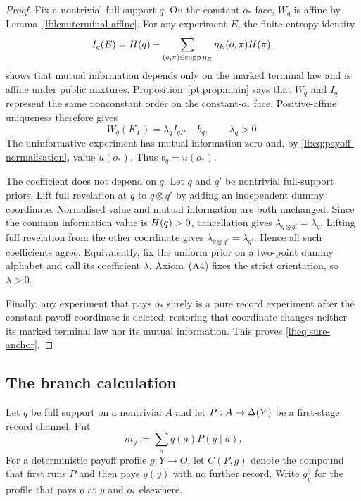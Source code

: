 \begin{proof}
Fix a nontrivial full-support $q$.  On the constant-$o_\ast$ face, $W_q$ is
affine by Lemma~\ref{lf:lem:terminal-affine}.  For any experiment $E$, the
finite entropy identity
\begin{equation}
I_q(E)=H(q)-\sum_{(o,\pi)\in\operatorname{supp}\eta_E}
\eta_E(o,\pi)H(\pi).
\label{lf:eq:posterior-entropy}
\end{equation}
shows that mutual information depends only on the marked terminal law and is
affine under public mixtures.  Proposition~\ref{pt:prop:main} says that $W_q$ and
$I_q$ represent the same nonconstant order on the constant-$o_\ast$ face.
Positive-affine uniqueness therefore gives
\[
W_q(K_P)=\lambda_q I_{qP}+b_q,
\qquad \lambda_q>0.
\]
The uninformative experiment has mutual information zero and, by
\eqref{lf:eq:payoff-normalisation}, value $u(o_\ast)$.  Thus $b_q=u(o_\ast)$.

The coefficient does not depend on $q$.  Let $q$ and $q'$ be nontrivial
full-support priors.  Lift full revelation at $q$ to $q\otimes q'$ by adding an
independent dummy coordinate.  Normalised value and mutual information are both
unchanged.  Since the common information value is $H(q)>0$, cancellation
gives $\lambda_{q\otimes q'}=\lambda_q$.  Lifting full revelation from the
other coordinate gives $\lambda_{q\otimes q'}=\lambda_{q'}$.  Hence all such
coefficients agree.  Equivalently, fix the uniform prior on a two-point dummy
alphabet and call its coefficient $\lambda$.  Axiom~\textup{(A4)} fixes the
strict orientation, so $\lambda>0$.

Finally, any experiment that pays $o_\ast$ surely is a pure record experiment
after the constant payoff coordinate is deleted; restoring that coordinate
changes neither its marked terminal law nor its mutual information.  This
proves \eqref{lf:eq:sure-anchor}.
\end{proof}

\subsection{The branch calculation}

Let $q$ be full support on a nontrivial $A$ and let
$P:A\to\Delta(Y)$ be a first-stage record channel.  Put
\[
m_y:=\sum_a q(a)P(y\mid a).
\]
For a deterministic payoff profile $g:Y\to O$, let $C(P,g)$ denote the
compound that first runs $P$ and then pays $g(y)$ with no further record.
Write $g_y^o$ for the profile that pays $o$ at $y$ and $o_\ast$ elsewhere.

